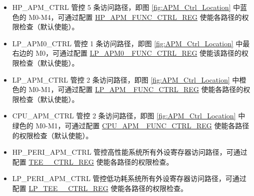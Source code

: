 \documentclass[main\_\_CN.tex]{subfiles}
\begin{document}
\begin{itemize}
    \item HP\_APM\_CTRL 管控 5 条访问路径，即图 \ref{fig:APM_Ctrl_Location} 中蓝色的 M0-M4，可通过配置 \hyperref[regdesc:HPAPMFUNCCTRLREG]{HP\_APM\_FUNC\_CTRL\_REG} 使能各路径的权限检查（默认使能）。

    \item LP\_APM0\_CTRL 管控 1 条访问路径，即图 \ref{fig:APM_Ctrl_Location} 中最右边的 M0，可通过配置 \hyperref[regdesc:LPAPM0FUNCCTRLREG]{LP\_APM0 \_FUNC\_CTRL\_REG} 使能该路径的权限检查（默认使能）。

    \item LP\_APM\_CTRL 管控 2 条访问路径，即图 \ref{fig:APM_Ctrl_Location} 中橙色的 M0-M1，可通过配置 \hyperref[regdesc:LPAPMFUNCCTRLREG]{LP\_APM \_FUNC\_CTRL\_REG} 使能各路径的权限检查（默认使能）。

    \item CPU\_APM\_CTRL 管控 2 条访问路径，即图 \ref{fig:APM_Ctrl_Location} 中绿色的 M0-M1，可通过配置 \hyperref[regdesc:CPUAPMFUNCCTRLREG]{CPU\_APM \_FUNC\_CTRL\_REG} 使能各路径的权限检查（默认使能）。

    \item HP\_PERI\_APM\_CTRL 管控高性能系统所有外设寄存器访问路径，可通过配置 \hyperref[regdesc:TEEPERICTRLREG]{TEE\_\_CTRL\_REG} 使能各路径的权限检查。

    \item LP\_PERI\_APM\_CTRL 管控低功耗系统所有外设寄存器访问路径，可通过配置 \hyperref[regdesc:LPTEEPERICTRLREG]{LP\_TEE\_\_CTRL\_REG} 使能各路径的权限检查。
\end{itemize}
\end{document}
